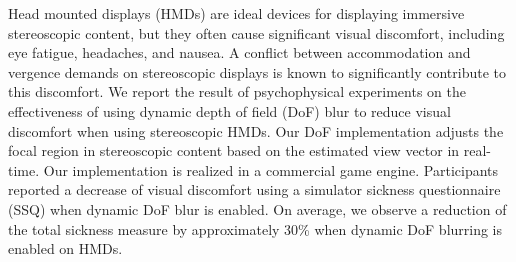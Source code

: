 Head mounted displays (HMDs) are ideal devices for displaying immersive stereoscopic content, but they often cause significant visual discomfort, including eye fatigue, headaches, and nausea. A conflict between accommodation and vergence demands on stereoscopic displays is known to significantly contribute to this discomfort. We report the result of psychophysical experiments on the effectiveness of using dynamic depth of field (DoF) blur to reduce visual discomfort when using stereoscopic HMDs. Our DoF implementation adjusts the focal region in stereoscopic content based on the estimated view vector in real-time. Our implementation is realized in a commercial game engine. Participants reported a decrease of visual discomfort using a simulator sickness questionnaire (SSQ) when dynamic DoF blur is enabled. On average, we observe a reduction of the total sickness measure by approximately 30\% when dynamic DoF blurring is enabled on HMDs. 

